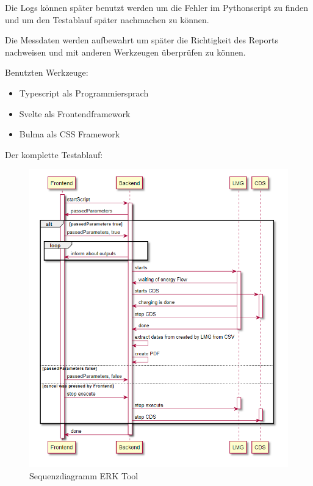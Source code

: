         Die Logs können später benutzt werden um die Fehler im Pythonscript zu finden und um den Testablauf später nachmachen zu können.

        Die Messdaten werden aufbewahrt um später die Richtigkeit des Reports nachweisen und mit anderen Werkzeugen überprüfen zu können.

        Benutzten Werkzeuge:
        \begin{itemize}
            \item Typescript als Programmiersprach
            \item Svelte als Frontendframework
            \item Bulma als CSS Framework
        \end{itemize}

        \newpage
        Der komplette Testablauf:
        \begin{figure}[H]
            \centering
            \includegraphics[width=1\textwidth]{./UML.png}
            \caption{Sequenzdiagramm ERK Tool}
            \label{fig:flow around cylinder}
        \end{figure}




